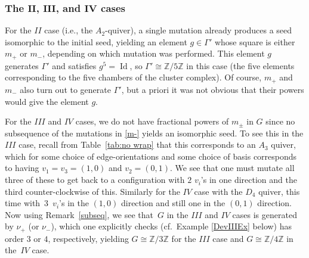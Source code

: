 \documentclass[10pt,a4paper]{amsart}
\numberwithin{equation}{section}
\numberwithin{figure}{section}
\numberwithin{table}{section}
\DeclareMathOperator{\id}{Id}
\let\bb=\mathbb
\theoremstyle{definition}
\begin{document}
\subsubsection[The $II$, $III$, and $IV$ cases]{The $\boldsymbol{II}$, $\boldsymbol{III}$, and $\boldsymbol{IV}$ cases} For the $II$ case (i.e., the $A_2$-quiver), a single mutation already produces a seed isomorphic to the initial seed, yielding an element $g\in \Gamma'$ whose square is either $m_+$ or $m_-$, depending on which mutation was performed. This element $g$ generates $\Gamma'$ and satisfies $g^5=\id$, so $\Gamma'\cong \bb{Z}/5\bb{Z}$ in this case (the five elements corresponding to the five chambers of the cluster complex). Of course, $m_+$ and $m_-$ also turn out to generate $\Gamma'$, but a priori it was not obvious that their powers would give the element $g$.

For the $III$ and $IV$ cases, we do not have fractional powers of $m_{\pm}$ in $G$ since no subsequence of the mutations in \eqref{m-} yields an isomorphic seed. To see this in the $III$ case, recall from Table~\ref{tab:no wrap} that this corresponds to an $A_3$ quiver, which for some choice of edge-orientations and some choice of basis corresponds to having $v_1=v_3=(1,0)$ and $v_2=(0,1)$. We see that one must mutate all three of these to get back to a configuration with $2$ $v_i$'s in one direction and the third counter-clockwise of this. Similarly for the $IV$ case with the $D_4$ quiver, this time with~$3$~$v_i$'s in the $(1,0)$ direction and still one in the $(0,1)$ direction. Now using Remark~\ref{subseq}, we see that~$G$ in the $III$ and $IV$ cases is generated by $\nu_+$ (or $\nu_-$), which one explicitly checks (cf.\ Example \ref{DevIIIEx} below) has order $3$ or $4$, respectively, yielding $G\cong \bb{Z}/3\bb{Z}$ for the $III$ case and $G\cong \bb{Z}/4\bb{Z}$ in the~$IV$ case.
\end{document}
